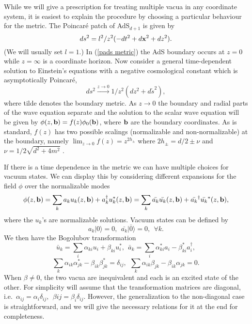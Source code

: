 \documentclass[a4paper,aps,prd,preprintnumbers,groupedaddress]{revtex4}
\begin{document}
While we will give a prescription for treating multiple vacua in any coordinate system, it is easiest to explain the procedure by choosing a particular behaviour for the metric.   The Poincar\'{e} patch of AdS$_{d+1}$ is  given by
\begin{equation}
\label{pads metric} ds^2 = l^2/z^2 (-dt^2 +d {\bf x} ^2 + dz^2).
\end{equation}
(We will usually set $l=1$.)   In (\ref{pads metric}) the AdS boundary occurs at $z=0$ while $z=\infty$ is a coordinate horizon.   Now consider a general time-dependent solution to Einstein's equations with a negative cosmological constant which is asymptotically Poincar\'{e},
\begin{equation}
\label{modified pads metric} ds^2 \stackrel{z \rightarrow 0}{\longrightarrow}1/z^2 (dz^2 +d\tilde{s} ^2),
\end{equation}
where tilde denotes the boundary metric.   As $z \rightarrow 0$ the boundary and radial parts of the wave equation separate and the solution to the scalar wave equation will be given by $\phi(z,{\bf b})=f(z)\phi_0({\bf b})$, where ${\bf b}$ are the boundary coordinates.   As is standard, $f(z)$ has
two possible scalings (normalizable  and non-normalizable) at the boundary, namely $\lim_{z \rightarrow 0} f(z) = z^{2 h_{\pm}}$ where $2h_{\pm} = d/2 \pm \nu$ and $\nu = 1/2
\sqrt{d^2 +4m^2}$ \cite{vijay981}.


If there is a time dependence in the metric we can have multiple choices for vacuum states.  We can display this by considering different  expansions for the field $\phi$ over the normalizable modes
\begin{equation} \label{phi expansion}
\phi(z,{\bf b})= \sum_k a_k u_k (z,{\bf b}) + a_k ^\dagger u_k ^* (z,{\bf b}) = \sum_k \bar{a_k} \bar{u_k} (z,{\bf b}) +\bar{a_k}^\dagger
\bar{u_k} ^* (z,{\bf b}) ,
\end{equation}
where the $u_k$'s are normalizable solutions.   Vacuum states can be defined by
\begin{equation} \label{definition of vacua}
a_k|0 \rangle =0 , \ \ \bar{a_k}| \bar{0} \rangle =0 , \ \ \forall k .
\end{equation}
We then have the Bogolubov transformation
\begin{equation} \label{b transformation}
\bar{u} _k = \sum_i \alpha _{ki} u_i + \beta _{ki} u_i ^* , \ \ \bar{a}_k = \sum_i \alpha ^* _{ki} a_i - \beta ^* _{ki} a_i ^\dagger ,
\end{equation}
\begin{equation} \label{b conditions}
\sum_k \alpha_{ik} \alpha_{jk} ^* - \beta_{ik} \beta_{jk} ^* = \delta_{ij} , \ \ \sum_k \alpha_{ik} \beta _{jk} - \beta_{ik} \alpha_{jk} =0.
\end{equation}
When $\beta \neq 0$,  the two vacua are inequivalent and each is an excited state of the other.
For simplicity will assume that the transformation matrices are diagonal, i.e.\ $\alpha_{ij} = \alpha_i \delta_{ij}, \
\ \beta{ij} = \beta_i \delta _{ij}$.  However, the generalization to the non-diagonal case is straightforward, and we will give the necessary
relations for it at the end for completeness.
\end{document}
